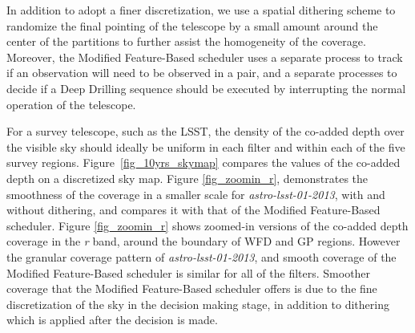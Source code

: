 \documentclass[12pt]{aastex62}
\theoremstyle{definition}
\begin{document}
In addition to adopt a finer discretization, we use a spatial dithering scheme to randomize the final pointing of the telescope by a small amount around the center of the partitions to further assist the homogeneity of the coverage. Moreover, the Modified Feature-Based scheduler uses a separate process to track if an observation will need to be observed in a pair, and a separate processes to decide if a Deep Drilling sequence should be executed by interrupting the normal operation of the telescope.


%

For a survey telescope, such as the LSST, the density of the co-added depth over the visible sky should ideally be uniform in each filter and within each of the five survey regions. Figure~\ref{fig_10yrs_skymap} compares the values of the co-added depth on a discretized sky map. Figure \ref{fig_zoomin_r}, demonstrates the smoothness of the coverage in a smaller scale for \textit{astro-lsst-01-2013}, with and without dithering, and compares it with that of the Modified Feature-Based scheduler. Figure \ref{fig_zoomin_r} shows zoomed-in versions of the co-added depth coverage in the \textit{r} band, around the boundary of WFD and GP regions. However the granular coverage pattern of \textit{astro-lsst-01-2013}, and smooth coverage of the Modified Feature-Based scheduler is similar for all of the filters. Smoother coverage that the Modified Feature-Based scheduler offers is due to the fine discretization of the sky in the decision making stage, in addition to dithering which is applied after the decision is made. 
\end{document}
